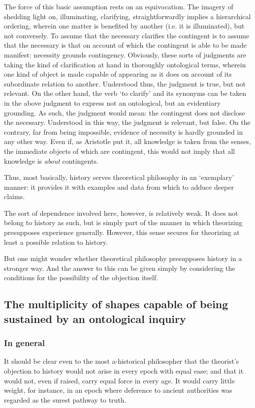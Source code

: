 \documentclass[]{article}
\begin{document}
The force of this basic assumption rests on an equivocation. The imagery of shedding light on, illuminating, clarifying, straightforwardly implies a hierarchical ordering, wherein one matter is benefited by another (i.e. it is illuminated), but not conversely. To assume that the necessary clarifies the contingent is to assume that the necessary is that on account of which the contingent is able to be made manifest: necessity grounds contingency. Obviously, these sorts of judgments are taking the kind of clarification at hand in thoroughly ontological terms, wherein one kind of object is made capable of appearing as it does on account of its subordinate relation to another. Understood thus, the judgment is true, but not relevant. On the other hand, the verb `to clarify' and its synonyms can be taken in the above judgment to express not an ontological, but an evidentiary grounding. As such, the judgment would mean: the contingent does not disclose the necessary. Understood in this way, the judgment is relevant, but false. On the contrary, far from being impossible, evidence of necessity is hardly grounded in any other way. Even if, as Aristotle put it, all knowledge is taken from the senses, the immediate objects of which are contingent, this would not imply that all knowledge is \textit{about} contingents. 

Thus, most basically, history serves theoretical philosophy in an `exemplary' manner: it provides it with examples and data from which to adduce deeper claims. 

The sort of dependence involved here, however, is relatively weak. It does not belong to history as such, but is simply part of the manner in which theorizing presupposes experience generally. However, this sense secures for theorizing at least a possible relation to history.

But one might wonder whether theoretical philosophy presupposes history in a stronger way. And the answer to this can be given simply by considering the conditions for the possibility of the objection itself. 

\subsection{The multiplicity of shapes capable of being sustained by an ontological inquiry}
\subsubsection{In general}
It should be clear even to the most a-historical philosopher that the theorist's objection to history would not arise in every epoch with equal ease; and that it would not, even if raised, carry equal force in every age. It would carry little weight, for instance, in an epoch where deference to ancient authorities was regarded as the surest pathway to truth.
\end{document}
